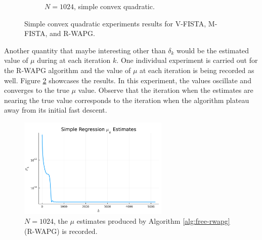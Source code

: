 \documentclass[12pt]{article}
\begin{document}
\begin{figure}[H]
\begin{subfigure}[b]{0.47\textwidth}
                    \caption{$N = 1024$, simple convex quadratic. }
                \end{subfigure}
                \caption{Simple convex quadratic experiments results for V-FISTA, M-FISTA, and R-WAPG. }
                \label{fig:simple-quadratic-NOG}
            \end{figure}
            \par
            Another quantity that maybe interesting other than $\delta_k$ would be the estimated value of $\mu$ during at each iteration $k$. 
            One individual experiment is carried out for the R-WAPG algorithm and the value of $\mu$ at each iteration is being recorded as well. 
            Figure \ref{fig:simple-quadratic-r-wapg-mu-estimates} showcases the results. 
            In this experiment, the values oscillate and converges to the true $\mu$ value. 
            Observe that the iteration when the estimates are nearing the true value corresponds to the iteration when the algorithm plateau away from its initial fast descent. 
            \begin{figure}[H]
                \centering
                \includegraphics[width=0.64\textwidth]{assets/simple_regression_loss_sc_estimates_1024.png}
                \caption{$N = 1024$, the $\mu$ estimates produced by Algorithm \ref{alg:free-rwapg} (R-WAPG) is recorded. }
                \label{fig:simple-quadratic-r-wapg-mu-estimates}
            \end{figure}
\end{document}
